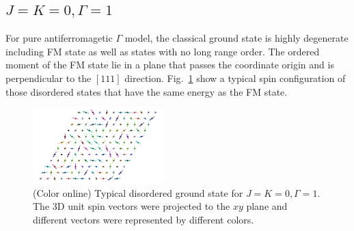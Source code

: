 \documentclass[aps,prb,reprint,amsfonts,amsmath,amssymb,showpacs,groupedaddress,superscriptaddress]{revtex4-1}
\begin{document}
\subsection{$J=K=0, \Gamma=1$}
For pure antiferromagetic $\Gamma$ model, the classical ground state is highly degenerate including FM state as well as states with no long range order. The ordered moment of the FM state lie in a plane that passes the coordinate origin and is perpendicular to the $[111]$ direction. Fig.~\ref{fig:GSForPositiveGamma} show a typical spin configuration of those disordered states that have the same energy as the FM state.
\begin{figure}
    \includegraphics[width=0.45\textwidth]{FigA1.pdf}
    \caption{\label{fig:GSForPositiveGamma}(Color online) Typical disordered ground state for $J=K=0, \Gamma=1$. The 3D unit spin vectors were projected to the $xy$ plane and different vectors were represented by different colors.}
\end{figure}
\end{document}
